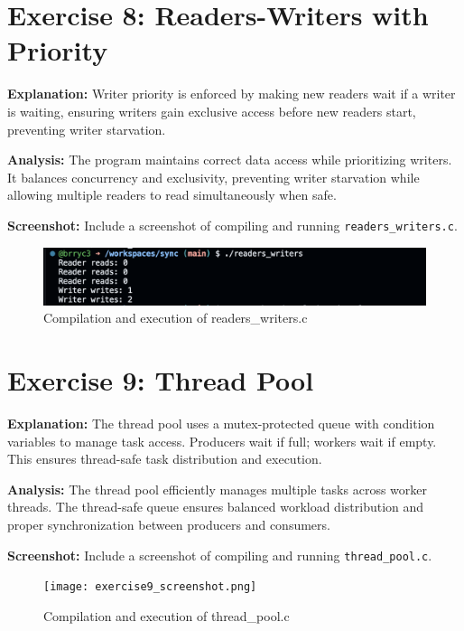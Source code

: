 \documentclass{article}
\begin{document}
\section{Exercise 8: Readers-Writers with Priority}


\textbf{Explanation:} Writer priority is enforced by making new readers wait if a writer is waiting, ensuring writers gain exclusive access before new readers start, preventing writer starvation.

\textbf{Analysis:} The program maintains correct data access while prioritizing writers. It balances concurrency and exclusivity, preventing writer starvation while allowing multiple readers to read simultaneously when safe.

\textbf{Screenshot:} Include a screenshot of compiling and running \texttt{readers\_writers.c}.
\begin{figure}[h]
\centering
\includegraphics[width=\textwidth]{exercise8_screenshot.png}
\caption{Compilation and execution of readers\_writers.c}
\end{figure}

\section{Exercise 9: Thread Pool}


\textbf{Explanation:} The thread pool uses a mutex-protected queue with condition variables to manage task access. Producers wait if full; workers wait if empty. This ensures thread-safe task distribution and execution.

\textbf{Analysis:} The thread pool efficiently manages multiple tasks across worker threads. The thread-safe queue ensures balanced workload distribution and proper synchronization between producers and consumers.

\textbf{Screenshot:} Include a screenshot of compiling and running \texttt{thread\_pool.c}.
\begin{figure}[h]
\centering
\texttt{[image: exercise9\_screenshot.png]}
\caption{Compilation and execution of thread\_pool.c}
\end{figure}
\end{document}
